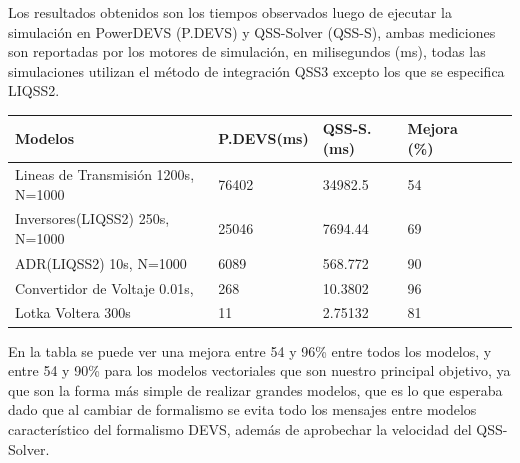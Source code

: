 	Los resultados obtenidos son los tiempos observados luego de ejecutar la simulación en PowerDEVS (P.DEVS) y QSS-Solver (QSS-S), ambas mediciones
	son reportadas por los motores de simulación, en milisegundos (ms), todas las simulaciones utilizan el método de integración QSS3 excepto los que 
	se especifica LIQSS2.

\begin{table}[H]
\centering	
\label{my-label}
\begin{tabular}{llllll}
\toprule
{\bf Modelos}            &  {\bf P.DEVS(ms)} & {\bf QSS-S. (ms)} & {\bf Mejora (\%)} \\
\toprule
Lineas de Transmisión 1200s, N=1000     & 76402         & 34982.5         & 54          \\
Inversores(LIQSS2) 250s, N=1000   	& 25046         & 7694.44         & 69        \\
ADR(LIQSS2) 10s, N=1000 		& 6089          & 568.772         & 90        \\
Convertidor de Voltaje 0.01s,        	& 268           & 10.3802         & 96         \\
Lotka  Voltera 300s      		& 11            & 2.75132         & 81

\end{tabular}
\end{table}

	En la tabla se puede ver una mejora entre 54 y 96\% entre todos los modelos, y entre 54 y 90\% para los modelos vectoriales que son nuestro principal objetivo,
	ya que son la forma más simple de realizar grandes modelos, que es lo que esperaba dado que al cambiar de formalismo se evita todo los mensajes entre modelos 
	característico del formalismo DEVS, además de aprobechar la velocidad del QSS-Solver.
